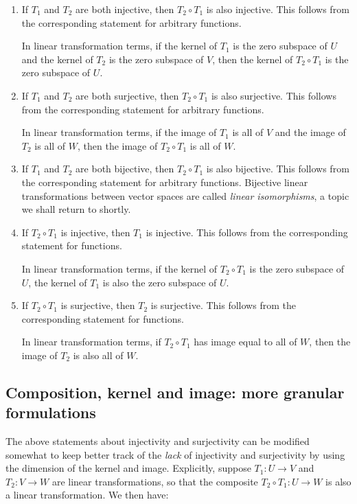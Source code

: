 \documentclass[10pt]{amsart}
\begin{document}
\begin{enumerate}
\item If $T_1$ and $T_2$ are both injective, then $T_2 \circ T_1$ is
  also injective. This follows from the corresponding statement for
  arbitrary functions.

  In linear transformation terms, if the kernel of $T_1$ is the zero
  subspace of $U$ and the kernel of $T_2$ is the zero subspace of $V$,
  then the kernel of $T_2 \circ T_1$ is the zero subspace of $U$.

\item If $T_1$ and $T_2$ are both surjective, then $T_2 \circ T_1$ is
  also surjective. This follows from the corresponding statement for
  arbitrary functions.

  In linear transformation terms, if the image of $T_1$ is all of $V$
  and the image of $T_2$ is all of $W$, then the image of $T_2 \circ
  T_1$ is all of $W$.

\item If $T_1$ and $T_2$ are both bijective, then $T_2 \circ T_1$ is
  also bijective. This follows from the corresponding statement for
  arbitrary functions. Bijective linear transformations between vector
  spaces are called {\em linear isomorphisms}, a topic we shall return
  to shortly.
\item If $T_2 \circ T_1$ is injective, then $T_1$ is injective. This
  follows from the corresponding statement for functions.

  In linear transformation terms, if the kernel of $T_2 \circ T_1$ is
  the zero subspace of $U$, the kernel of $T_1$ is also the zero
  subspace of $U$.
\item If $T_2 \circ T_1$ is surjective, then $T_2$ is surjective. This
  follows from the corresponding statement for functions.

  In linear transformation terms, if $T_2 \circ T_1$ has image equal
  to all of $W$, then the image of $T_2$ is also all of $W$.
\end{enumerate}

\subsection{Composition, kernel and image: more granular formulations}

The above statements about injectivity and surjectivity can be
modified somewhat to keep better track of the {\em lack} of
injectivity and surjectivity by using the dimension of the kernel and
image. Explicitly, suppose $T_1:U \to V$ and $T_2:V \to W$ are linear
transformations, so that the composite $T_2 \circ T_1: U \to W$ is
also a linear transformation. We then have:
\end{document}
